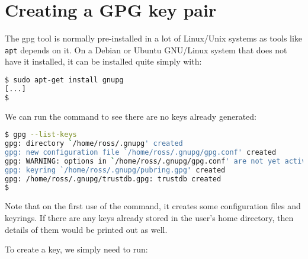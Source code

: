 \documentclass{report}
\begin{document}
\section{Creating a GPG key pair}

The gpg tool is normally pre-installed in a lot of Linux/Unix systems as
tools like \texttt{apt} depends on it. On
a Debian or Ubuntu GNU/Linux system that does not have it installed, it
can be installed quite simply with:

\begin{lstlisting}[language=bash]
$ sudo apt-get install gnupg
[...]
$
\end{lstlisting}

We can run the command to see there are no keys already generated:

\begin{lstlisting}[language=bash]
$ gpg --list-keys
gpg: directory `/home/ross/.gnupg' created
gpg: new configuration file `/home/ross/.gnupg/gpg.conf' created
gpg: WARNING: options in `/home/ross/.gnupg/gpg.conf' are not yet active during this run
gpg: keyring `/home/ross/.gnupg/pubring.gpg' created
gpg: /home/ross/.gnupg/trustdb.gpg: trustdb created
$
\end{lstlisting}

Note that on the first use of the command, it creates some configuration files
and keyrings. If there are any keys already stored in the user's home
directory, then details of them would be printed out as well.

To create a key, we simply need to run:
\end{document}
